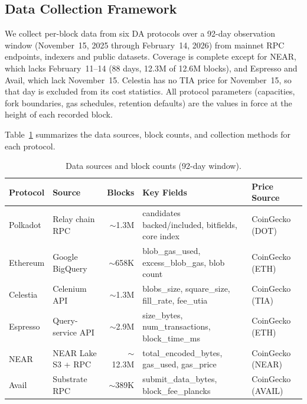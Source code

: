 
\subsection{Data Collection Framework}
\label{sec:meth-collection}

We collect per-block data from six DA protocols over a 92-day observation window (November~15, 2025 through February~14, 2026) from mainnet RPC endpoints, indexers and public datasets.
Coverage is complete except for NEAR, which lacks February~11--14 (88 days, 12.3M of 12.6M blocks), and Espresso and Avail, which lack November~15. Celestia has no TIA price for November~15, so that day is excluded from its cost statistics.
All protocol parameters (capacities, fork boundaries, gas schedules, retention defaults) are the values in force at the height of each recorded block.

Table~\ref{tab:collection_summary} summarizes the data sources, block counts, and collection methods for each protocol.

\begin{table}[t]
\centering
\caption{Data sources and block counts (92-day window).}
\label{tab:collection_summary}
\setlength{\tabcolsep}{3pt}
\footnotesize
\begin{tabular}{llrll}
\toprule
\textbf{Protocol} & \textbf{Source} & \textbf{Blocks} & \textbf{Key Fields} & \textbf{Price Source} \\
\midrule
Polkadot & Relay chain RPC & $\sim$1.3M & candidates backed/included, bitfields, core index & CoinGecko (DOT) \\
Ethereum & Google BigQuery & $\sim$658K & blob\_gas\_used, excess\_blob\_gas, blob count & CoinGecko (ETH) \\
Celestia & Celenium API & $\sim$1.3M & blobs\_size, square\_size, fill\_rate, fee\_utia & CoinGecko (TIA) \\
Espresso & Query-service API & $\sim$2.9M & size\_bytes, num\_transactions, block\_time\_ms & CoinGecko (ETH) \\
NEAR & NEAR Lake S3 + RPC & $\sim$12.3M & total\_encoded\_bytes, gas\_used, gas\_price & CoinGecko (NEAR) \\
Avail & Substrate RPC & $\sim$389K & submit\_data\_bytes, block\_fee\_plancks & CoinGecko (AVAIL) \\
\bottomrule
\end{tabular}
\end{table}

